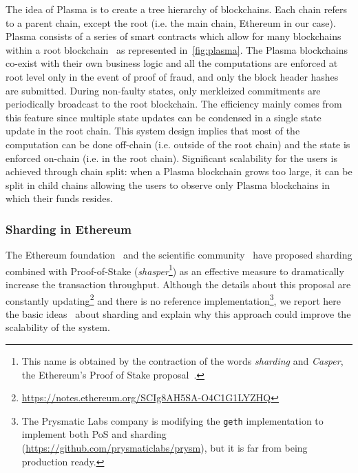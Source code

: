 The idea of Plasma is to create a tree hierarchy of blockchains. Each chain
refers to a parent chain, except the root (i.e. the main chain, Ethereum in our
case). Plasma consists of a series of smart contracts which allow for many
blockchains within a root blockchain~\cite{poon2017plasma} as represented
in~\autoref{fig:plasma}. The Plasma blockchains co-exist with their own business
logic and all the computations are enforced at root level only in the event of
proof of fraud, and only the block header hashes are submitted. During
non-faulty states, only merkleized commitments are periodically broadcast to the
root blockchain. The efficiency mainly comes from this feature since multiple
state updates can be condensed in a single state update in the root chain. This
system design implies that most of the computation can be done off-chain (i.e.
outside of the root chain) and the state is enforced on-chain (i.e. in the root
chain). Significant scalability for the users is achieved through chain split:
when a Plasma blockchain grows too large, it can be split in child chains
allowing the users to observe only Plasma blockchains in which their funds
resides.

\subsubsection{Sharding in Ethereum}
The Ethereum foundation~\cite{bib:mauve, bib:sharding-faq} and the scientific
community~\cite{bib:scaling-croman} have proposed sharding combined with
Proof-of-Stake (\emph{shasper}\footnote{This name is obtained by the contraction
of the words \emph{sharding} and \emph{Casper}, the Ethereum's Proof of Stake
proposal~\cite{bib:cbc-casper}.}) as an effective measure to dramatically
increase the transaction throughput. Although the details about this proposal
are constantly
updating\footnote{\url{https://notes.ethereum.org/SCIg8AH5SA-O4C1G1LYZHQ}} and
there is no reference implementation\footnote{The Prysmatic Labs company is
modifying the \texttt{geth} implementation to implement both PoS and sharding
(\url{https://github.com/prysmaticlabs/prysm}), but it is far from being
production ready.}, we report here the basic
ideas~\cite{bib:mauve,bib:sharding-faq} about sharding and explain why this
approach could improve the scalability of the system.

